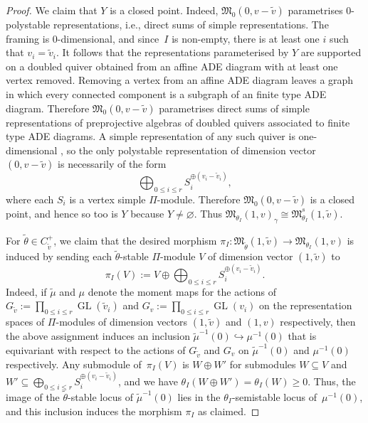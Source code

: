 \documentclass[10pt,a4paper]{amsart}
\newcommand{\GL}{\operatorname{GL}}
\numberwithin{equation}{section}
\begin{document}
\begin{proof}
 We claim that ${Y}$ is a closed point. Indeed, $\mathfrak{M}_0(0, v-\widetilde{v})$ parametrises
 0-polystable representations, i.e., direct sums of simple representations. The framing is 0-dimensional,
and since~$I$ is non-empty, there is at least one $i$ such that $v_i = \widetilde{v}_i$. It follows that the representations parameterised by ${Y}$
are supported on a doubled quiver obtained from an affine ADE diagram with at least one vertex removed. Removing a vertex from an affine ADE diagram leaves a graph in which every connected component is a subgraph of an finite type ADE diagram. Therefore $\mathfrak{M}_0(0, v-\widetilde{v})$ parametrises direct sums of simple representations of preprojective algebras of doubled quivers associated to finite type ADE diagrams. A simple representation of any such quiver is one-dimensional \cite[Lemma~2.2]{savage2011quiver}, so the only polystable representation of dimension vector $(0, v-\widetilde{v})$ is
necessarily of the form
\begin{equation}\label{eqn:directsumsimples}
\bigoplus_{0\leq i\leq r}S_i^{\oplus(v_i-\tilde{v}_i)},
\end{equation}
where each $S_i$ is a vertex simple $\Pi$-module. Therefore $\mathfrak{M}_0(0, v-\widetilde{v})$ is a closed point, and hence so too is ${Y}$ because ${Y}\neq \varnothing$. Thus $\mathfrak{M}_{\theta_I}(1,v)_{\gamma} \cong \mathfrak{M}^s_{\theta_I}(1,\widetilde{v})$.

For
 $\widetilde\theta\in C_{\widetilde v}^+$, we claim that the desired morphism $\pi_I\colon \mathfrak{M}_{\widetilde{\theta}}(1,\widetilde{v})\to \mathfrak{M}_{\theta_I}(1,v)$ is induced by sending each $\tilde{\theta}$-stable $\Pi$-module $V$ of dimension vector $(1,\tilde{v})$ to
 \[
 \pi_I(V):=V\oplus\bigoplus_{0\leq i\leq r}S_i^{\oplus(v_i-\tilde{v}_i)}.
 \]
 Indeed, if $\tilde{\mu}$ and $\mu$ denote the moment maps for the actions of $G_{\tilde{v}}:=\prod_{0\leq i\leq r}\GL(\tilde{v}_i)$ and $G_{v}:=\prod_{0\leq i\leq r}\GL(v_i)$ on the representation spaces of $\Pi$-modules of dimension vectors $(1,\tilde{v})$ and $(1,v)$ respectively, then the above assignment induces an inclusion $\tilde{\mu}^{-1}(0)\hookrightarrow \mu^{-1}(0)$ that is equivariant with respect to the actions of $G_{\tilde{v}}$ and $G_v$ on $\tilde{\mu}^{-1}(0)$ and $\mu^{-1}(0)$ respectively. Any submodule of~$\pi_I(V)$ is $W\oplus W'$ for submodules $W\subseteq V$ and $W'\subseteq \bigoplus_{0\leq i\leq r}S_i^{\oplus(v_i-\tilde{v}_i)}$, and we have $\theta_I(W\oplus W') = \theta_I(W)\geq 0$. Thus, the image of the $\tilde{\theta}$-stable locus of $\tilde{\mu}^{-1}(0)$ lies in the $\theta_I$-semistable locus of~$\mu^{-1}(0)$, and this inclusion induces the morphism $\pi_I$ as claimed.


\end{proof}
\end{document}
